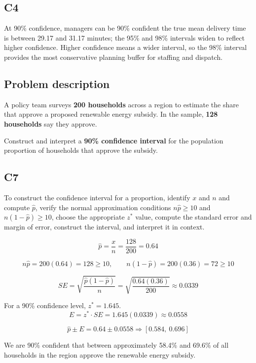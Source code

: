 \begin{ExamProblems}
		\subsection*{C4}
		At 90\% confidence, managers can be 90\% confident the true mean delivery time is between 29.17 and 31.17 minutes; the 95\% and 98\% intervals widen to reflect higher confidence. Higher confidence means a wider interval, so the 98\% interval provides the most conservative planning buffer for staffing and dispatch.
		
		\item
		\subsection*{Problem description}
		A policy team surveys \textbf{200 households} across a region to estimate the share that approve a proposed renewable energy subsidy. In the sample, \textbf{128 households} say they approve.
		
		Construct and interpret a \textbf{90\% confidence interval} for the population proportion of households that approve the subsidy.
		
		\subsection*{C7}
		To construct the confidence interval for a proportion, identify $x$ and $n$ and compute $\hat{p}$, verify the normal approximation conditions $n\hat{p} \ge 10$ and $n(1-\hat{p}) \ge 10$, choose the appropriate $z^*$ value, compute the standard error and margin of error, construct the interval, and interpret it in context.
		
		\[
		\hat{p} = \frac{x}{n} = \frac{128}{200} = 0.64
		\]
		
		\[
		n\hat{p} = 200(0.64) = 128 \ge 10, \qquad n(1-\hat{p}) = 200(0.36) = 72 \ge 10
		\]
		
		\[
		SE = \sqrt{\frac{\hat{p}(1-\hat{p})}{n}} = \sqrt{\frac{0.64(0.36)}{200}} \approx 0.0339
		\]
		
		For a 90\% confidence level, $z^* = 1.645$.
		\[
		E = z^* \cdot SE = 1.645(0.0339) \approx 0.0558
		\]
		
		\[
		\hat{p} \pm E = 0.64 \pm 0.0558 \Rightarrow [0.584,\ 0.696]
		\]
		
		We are 90\% confident that between approximately 58.4\% and 69.6\% of all households in the region approve the renewable energy subsidy.
		
	\end{ExamProblems}
	


